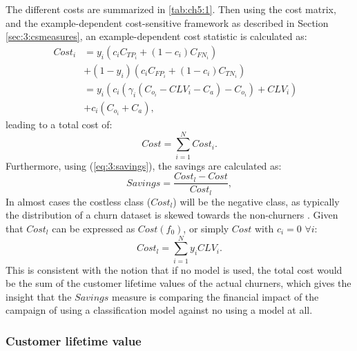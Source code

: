 The different costs are summarized in \tablename{ \ref{tab:ch5:1}}.	Then using the cost 
matrix, and the example-dependent cost-sensitive framework as described in Section 
\ref{sec:3:csmeasures}, an example-dependent cost statistic is calculated as:
\newpage
\begin{align}
  Cost_i &= y_i(c_i C_{TP_i} + (1-c_i)C_{FN_i})& \nonumber \\
         &  + (1-y_i)(c_i C_{FP_i} + (1-c_i)C_{TN_i})& \nonumber \\
         &= y_i(c_i\left(\gamma_i(C_{o_i}-CLV_i-C_a)-C_{o_i}\right)+CLV_i)&\nonumber \\
         & +c_i(C_{o_i}+C_a),&
	\end{align}
leading to a total cost of:
\begin{equation}
    Cost = \sum_{i=1}^N Cost_i.
\end{equation}
Furthermore, using (\ref{eq:3:savings}), the savings are calculated as:
\begin{equation}
  Savings = \frac{Cost_l - Cost}{Cost_l},
\end{equation} 
In almost cases the costless class ($Cost_l$) will be the negative class, as typically the 
distribution of a churn dataset is skewed towards the non-churners \citep{Verbeke2012}. Given that 
$Cost_l$ can be expressed as $Cost(f_0)$, or simply $Cost$ with $c_i=0$ $\forall i$:
\begin{equation}
 Cost_l = \sum_{i=1}^{N} y_i CLV_i.
\end{equation}
This is consistent with the notion that if no model is used, the total cost would be the 
sum of the customer lifetime values of the actual churners, which gives the insight 
that the $Savings$ measure is comparing the financial impact of the campaign of using a 
classification model against no using a model at all.


\subsubsection{Customer lifetime value}

